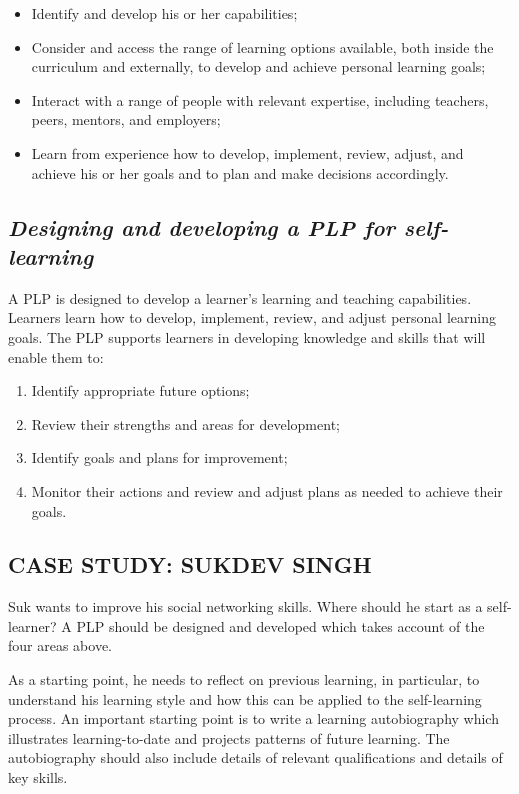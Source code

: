 \begin{itemize}
\item
  Identify and develop his or her capabilities;
\item
  Consider and access the range of learning options available, both
  inside the curriculum and externally, to develop and achieve personal
  learning goals;
\item
  Interact with a range of people with relevant expertise, including
  teachers, peers, mentors, and employers;
\item
  Learn from experience how to develop, implement, review, adjust, and
  achieve his or her goals and to plan and make decisions accordingly.
\end{itemize}
\subsection{\emph{Designing and developing a PLP for self-learning}}

A PLP is designed to develop a learner's learning and teaching
capabilities. Learners learn how to develop, implement, review, and
adjust personal learning goals. The PLP supports learners in developing
knowledge and skills that will enable them to:

\begin{enumerate}
\item
  Identify appropriate future options;
\item
  Review their strengths and areas for development;
\item
  Identify goals and plans for improvement;
\item
  Monitor their actions and review and adjust plans as needed to achieve
  their goals.
\end{enumerate}
\subsection{CASE STUDY: SUKDEV SINGH}

Suk wants to improve his social networking skills. Where should he start
as a self-learner? A PLP should be designed and developed which takes
account of the four areas above.

As a starting point, he needs to reflect on previous learning, in
particular, to understand his learning style and how this can be applied
to the self-learning process. An important starting point is to write a
learning autobiography which illustrates learning-to-date and projects
patterns of future learning. The autobiography should also include
details of relevant qualifications and details of key skills.

